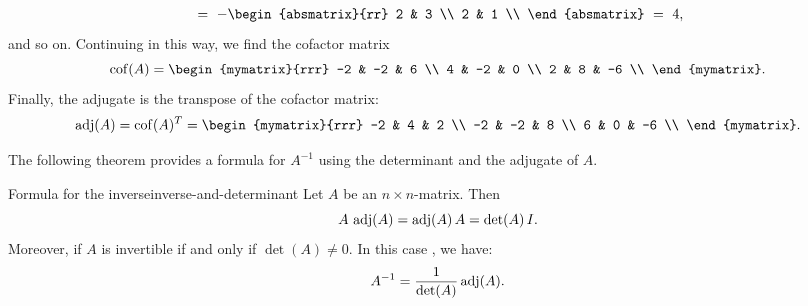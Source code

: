 \begin{solution}
\begin{eqnarray*}
    ~=~ -\begin{absmatrix}{rr}
      2 & 3 \\
      2 & 1 \\
    \end{absmatrix}
    ~=~ 4,
  \end{eqnarray*}
  and so on. Continuing in this way, we find the cofactor matrix
  \begin{equation*}
    \cof(A)
    =
    \begin{mymatrix}{rrr}
      -2 & -2 & 6 \\
      4 & -2 & 0 \\
      2 & 8 & -6 \\
    \end{mymatrix}.
  \end{equation*}
  Finally, the adjugate is the transpose of the cofactor matrix:
  \begin{equation*}
    \adj(A) = \cof(A)^T =
    \begin{mymatrix}{rrr}
      -2 & 4 & 2 \\
      -2 & -2 & 8 \\
      6 & 0 & -6 \\
    \end{mymatrix}.
  \end{equation*}
\end{solution}

The following theorem provides a formula for $A^{-1}$ using the
determinant and the adjugate of $A$.

\begin{theorem}{Formula for the inverse}{inverse-and-determinant}
  Let $A$ be an $n\times n$-matrix. Then
  \begin{equation*}
    A \, \adj(A) = \adj(A)\,A = \det(A)\,I.
  \end{equation*}
  Moreover, if $A$ is invertible if and only if $\det(A) \neq 0$. In this
  case%
  ,
  we have:
  \begin{equation*}
    A^{-1} = \frac{1}{\det(A)} \adj(A).
  \end{equation*}
\end{theorem}

